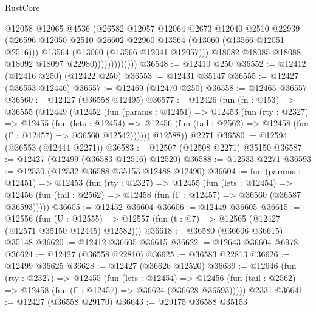 \begin{lexlean}{RustCore}
\begin{coremodule}
                              @12058
                              @12065
                              @4536
                              (@26582
                                @12057
                                @12064
                                @2673
                                @12040
                                @2510
                                @22939
                                (@26596
                                  @12050
                                  @2510
                                  @26602
                                  @22960
                                  @13564
                                  (@13060 (@13566 @12051 @2516)))
                                @13564
                                (@13060 (@13566 @12041 @12057)))
                              @18082
                              @18085
                              @18088
                              @18092
                              @18097
                              @22980)))))))))))))
@36548 := @12410 @250
@36552 := @12412 (@12416 @250) (@12422 @250)
@36553 := @12431 @35147
@36555 := @12427 (@36553 @12446)
@36557 := @12469 (@12470 @250)
@36558 := @12465 @36557
@36560 := @12427 (@36558 @12495)
@36577 := @12426
    (fun (fn : @153) =>
    @36555
      (@12449
        (@12452
          (fun (params : @12451) =>
          @12453
            (fun (rty : @2327) =>
            @12455
              (fun (lets : @12454) =>
              @12456 (fun (tail : @2562) => @12458 (fun (Γ : @12457) => @36560 @12542))))))
        @12588))
    @2271
@36580 := @12594 (@36553 (@12444 @2271))
@36583 := @12507 (@12508 @2271) @35150
@36587 := @12427 (@12499 (@36583 @12516) @12520)
@36588 := @12533 @2271
@36593 := @12530 (@12532 @36588 @35153 @12488 @12490)
@36604 := fun (params : @12451) =>
  @12453
    (fun (rty : @2327) =>
    @12455
      (fun (lets : @12454) =>
      @12456 (fun (tail : @2562) => @12458 (fun (Γ : @12457) => @36560 (@36587 @36593)))))
@36605 := @12452 @36604
@36606 := @12449 @36605
@36615 := @12556
    (fun (U : @12555) => @12557 (fun (t : @7) => @12565 (@12427 (@12571 @35150 @12445) @12582)))
@36618 := @36580 (@36606 @36615) @35148
@36620 := @12412 @36605 @36615
@36622 := @12643 @36604 @6978
@36624 := @12427 (@36558 @22810)
@36625 := @36583 @22813
@36626 := @12499 @36625
@36628 := @12427 (@36626 @12520)
@36639 := @12646
    (fun (rty : @2327) =>
    @12455
      (fun (lets : @12454) =>
      @12456 (fun (tail : @2562) => @12458 (fun (Γ : @12457) => @36624 (@36628 @36593)))))
    @2331
@36641 := @12427 (@36558 @29170)
@36643 := @29175 @36588 @35153

\end{coremodule}
\end{lexlean}
